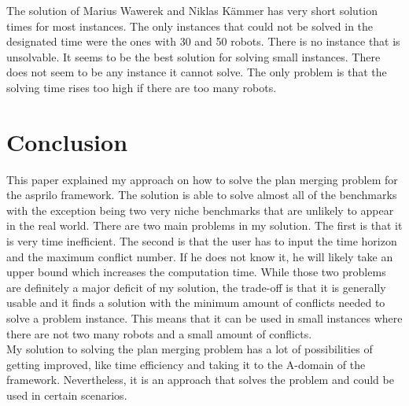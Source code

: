 \documentclass[runningheads]{llncs}
\begin{document}
The solution of Marius Wawerek and Niklas Kämmer \cite{github4} has very short solution times for most instances. The only instances that could not be solved in the designated time were the ones with 30 and 50 robots. There is no instance that is unsolvable. It seems to be the best solution for solving small instances. There does not seem to be any instance it cannot solve. The only problem is that the solving time rises too high if there are too many robots.

\section{Conclusion}
This paper explained my approach on how to solve the plan merging problem for the asprilo framework. The solution is able to solve almost all of the benchmarks with the exception being two very niche 
benchmarks that are unlikely to appear in the real world. There are two main problems in my solution. The first is that it is very time inefficient. The second is that the user has to input the time horizon and
the maximum conflict number. If he does not know it, he will likely take an upper bound which increases the computation time. While those two problems are definitely a major deficit of my solution, the trade-off
is that it is generally usable and it finds a solution with the minimum amount of conflicts needed to solve a problem instance. 
This means that it can be used in small instances where there are not two many robots and a small amount of conflicts.\\
My solution to solving the plan merging problem has a lot of possibilities of getting improved, like time efficiency and taking it to the A-domain of the framework. Nevertheless, it is an approach that solves the problem and could
be used in certain scenarios.

\newpage
\end{document}

